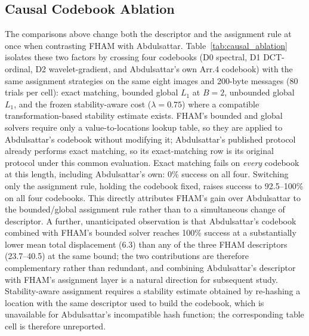 \documentclass[preprint,12pt]{elsarticle}
\theoremstyle{plain}
\begin{document}
\begin{table}[!t]
\centering
\caption{Stability-Aware Lambda Sweep ($B=8$, Length 100)}
\label{tab:stability_lambda}

\end{table}

\begin{table}[!t]
\centering
\small
\caption{Transfer of the Stability Weight to the Scene Holdout}
\label{tab:lambda_transfer}
\resizebox{\linewidth}{!}{}
\end{table}

\subsection{Causal Codebook Ablation}

The comparisons above change both the descriptor and the assignment rule at
once when contrasting FHAM with Abdulsattar. Table~\ref{tab:causal_ablation}
isolates these two factors by crossing four codebooks (D0 spectral, D1
DCT-ordinal, D2 wavelet-gradient, and Abdulsattar's own Arr.4 codebook) with
the same assignment strategies on the same eight images and 200-byte
messages (80 trials per cell): exact matching, bounded global $L_1$ at
$B=2$, unbounded global $L_1$, and the frozen stability-aware cost
($\lambda=0.75$) where a compatible transformation-based stability estimate
exists. FHAM's bounded and global solvers require only a value-to-locations
lookup table, so they are applied to Abdulsattar's codebook without
modifying it; Abdulsattar's published protocol already performs exact
matching, so its exact-matching row is its original protocol under this
common evaluation. Exact matching fails on \emph{every} codebook at this
length, including Abdulsattar's own: 0\% success on all four. Switching only
the assignment rule, holding the codebook fixed, raises success to
92.5--100\% on all four codebooks. This directly attributes FHAM's gain over
Abdulsattar to the bounded/global assignment rule rather than to a
simultaneous change of descriptor. A further, unanticipated observation is
that Abdulsattar's codebook combined with FHAM's bounded solver reaches 100\%
success at a substantially lower mean total displacement (6.3) than any of
the three FHAM descriptors (23.7--40.5) at the same bound; the two
contributions are therefore complementary rather than redundant, and
combining Abdulsattar's descriptor with FHAM's assignment layer is a natural
direction for subsequent study. Stability-aware assignment requires a
stability estimate obtained by
re-hashing a location with the same descriptor used to build the codebook,
which is unavailable for Abdulsattar's incompatible hash function; the
corresponding table cell is therefore unreported.
\end{document}
